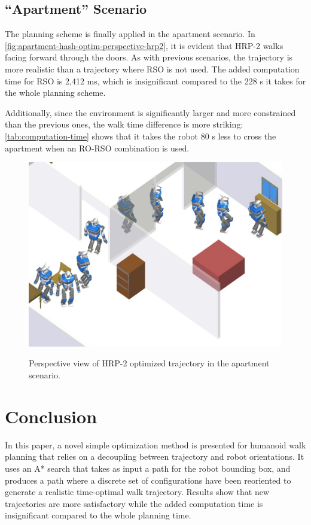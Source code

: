 \subsection{``Apartment'' Scenario}
The planning scheme is finally applied in the apartment
scenario. In \autoref{fig:apartment-hash-optim-perspective-hrp2}, it
is evident that HRP-2 walks facing forward through the doors. As with
previous scenarios, the trajectory is more realistic than a trajectory
where RSO is not used. The added computation time for RSO is 2,412 ms,
which is insignificant compared to the 228 s it takes for the whole
planning scheme.

Additionally, since the environment is significantly larger and more
constrained than the previous ones, the walk time difference is more
striking: \autoref{tab:computation-time} shows that it takes the robot
80 s less to cross the apartment when an RO-RSO combination is used.

\begin{figure}
  \centering
      {\includegraphics[width = \linewidth]
        {src/chap1-path-optimization/apartment-hash-optim-perspective-hrp2.png}}
      \caption{Perspective view of HRP-2 optimized trajectory in the
        apartment scenario.}
      \label{fig:apartment-hash-optim-perspective-hrp2}
\end{figure}

\section{Conclusion}
In this paper, a novel simple optimization method is
presented for humanoid walk planning that relies on a decoupling
between trajectory and robot orientations. It uses an A* search that
takes as input a path for the robot bounding box, and produces a path
where a discrete set of configurations have been reoriented to generate
a realistic time-optimal walk trajectory. Results show that new
trajectories are more satisfactory while the added computation time is
insignificant compared to the whole planning time.

